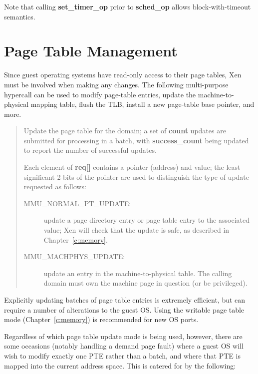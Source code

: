 \documentclass[11pt,twoside,final,openright]{report}
\newcommand{\hypercall}[1]{\vspace{2mm}{\sf #1}}
\begin{document}
Note that calling {\bf set\_timer\_op} prior to {\bf sched\_op} 
allows block-with-timeout semantics. 


\section{Page Table Management} 

Since guest operating systems have read-only access to their page 
tables, Xen must be involved when making any changes. The following
multi-purpose hypercall can be used to modify page-table entries, 
update the machine-to-physical mapping table, flush the TLB, install 
a new page-table base pointer, and more.

\begin{quote} 
\hypercall{mmu\_update(mmu\_update\_t *req, int count, int *success\_count)} 

Update the page table for the domain; a set of {\bf count} updates are
submitted for processing in a batch, with {\bf success\_count} being 
updated to report the number of successful updates.  

Each element of {\bf req[]} contains a pointer (address) and value; 
the least significant 2-bits of the pointer are used to distinguish 
the type of update requested as follows:
\begin{description} 

\item[MMU\_NORMAL\_PT\_UPDATE:] update a page directory entry or
page table entry to the associated value; Xen will check that the
update is safe, as described in Chapter~\ref{c:memory}.

\item[MMU\_MACHPHYS\_UPDATE:] update an entry in the
  machine-to-physical table. The calling domain must own the machine
  page in question (or be privileged).
\end{description}

\end{quote}

Explicitly updating batches of page table entries is extremely
efficient, but can require a number of alterations to the guest
OS. Using the writable page table mode (Chapter~\ref{c:memory}) is
recommended for new OS ports.

Regardless of which page table update mode is being used, however,
there are some occasions (notably handling a demand page fault) where
a guest OS will wish to modify exactly one PTE rather than a
batch, and where that PTE is mapped into the current address space.
This is catered for by the following:
\end{document}
